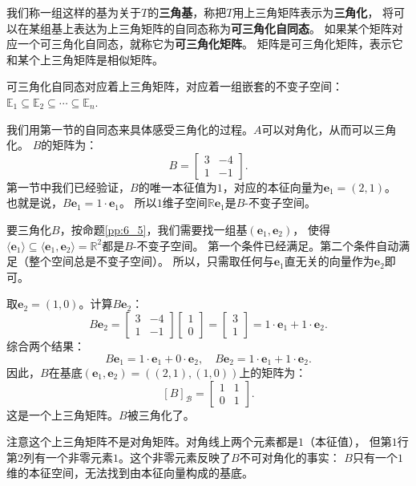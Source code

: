 \documentclass[12pt,UTF8,fontset=none]{ctexbook}
\begin{document}
我们称一组这样的基为关于$T$的\textbf{三角基}，称把$T$用上三角矩阵表示为\textbf{三角化}，
将可以在某组基上表达为上三角矩阵的自同态称为\textbf{可三角化自同态}。
如果某个矩阵对应一个可三角化自同态，就称它为\textbf{可三角化矩阵}。
矩阵是可三角化矩阵，表示它和某个上三角矩阵是相似矩阵。

可三角化自同态对应着上三角矩阵，对应着一组嵌套的不变子空间：$\mathbb{E}_1 \subseteq \mathbb{E}_2 \subseteq \cdots \subseteq \mathbb{E}_n$.

我们用第一节的自同态来具体感受三角化的过程。$A$可以对角化，从而可以三角化。
$B$的矩阵为：
$$
B = \begin{bmatrix} 3 & -4 \\ 1 & -1 \end{bmatrix}.
$$
第一节中我们已经验证，$B$的唯一本征值为$1$，对应的本征向量为$\mathbf{e}_1 = (2,1)$。
也就是说，$B\mathbf{e}_1 = 1 \cdot \mathbf{e}_1$。
所以$1$维子空间$\mathbb{R} \mathbf{e}_1$是$B$-不变子空间。

要三角化$B$，按命题\ref{pp:6_5}，我们需要找一组基$(\mathbf{e}_1, \mathbf{e}_2)$，
使得$\langle \mathbf{e}_1 \rangle \subseteq \langle \mathbf{e}_1, \mathbf{e}_2 \rangle = \mathbb{R}^2$都是$B$-不变子空间。
第一个条件已经满足。第二个条件自动满足（整个空间总是不变子空间）。
所以，只需取任何与$\mathbf{e}_1$直无关的向量作为$\mathbf{e}_2$即可。

取$\mathbf{e}_2 = (1, 0)$。计算$B\mathbf{e}_2$：
$$
B\mathbf{e}_2 = \begin{bmatrix} 3 & -4 \\ 1 & -1 \end{bmatrix}\begin{bmatrix} 1 \\ 0 \end{bmatrix} = \begin{bmatrix} 3 \\ 1 \end{bmatrix} = 1 \cdot \mathbf{e}_1 + 1 \cdot \mathbf{e}_2.
$$
综合两个结果：
$$
B\mathbf{e}_1 = 1 \cdot \mathbf{e}_1 + 0 \cdot \mathbf{e}_2, \quad B\mathbf{e}_2 = 1 \cdot \mathbf{e}_1 + 1 \cdot \mathbf{e}_2.
$$
因此，$B$在基底$(\mathbf{e}_1, \mathbf{e}_2) = ((2,1), (1,0))$上的矩阵为：
$$
[B]_{\mathcal{B}} = \begin{bmatrix} 1 & 1 \\ 0 & 1 \end{bmatrix}.
$$
这是一个上三角矩阵。$B$被三角化了。

注意这个上三角矩阵不是对角矩阵。对角线上两个元素都是$1$（本征值），
但第$1$行第$2$列有一个非零元素$1$。这个非零元素反映了$B$不可对角化的事实：
$B$只有一个$1$维的本征空间，无法找到由本征向量构成的基底。
\end{document}
